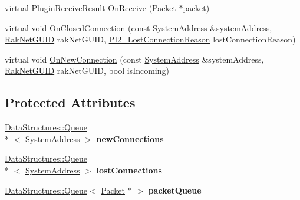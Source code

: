 \begin{DoxyCompactItemize}
\item 
virtual \hyperlink{group___p_l_u_g_i_n___i_n_t_e_r_f_a_c_e___g_r_o_u_p_ga89998adaafb29e5d879113b992161085}{Plugin\-Receive\-Result} \hyperlink{class_rak_net_1_1_rak_net_transport2_ad5607edbc41109fa3ab901c8eb47616d}{On\-Receive} (\hyperlink{struct_rak_net_1_1_packet}{Packet} $\ast$packet)
\item 
virtual void \hyperlink{class_rak_net_1_1_rak_net_transport2_a43bdc270a02f5584c5190b902ac243d9}{On\-Closed\-Connection} (const \hyperlink{struct_rak_net_1_1_system_address}{System\-Address} \&system\-Address, \hyperlink{struct_rak_net_1_1_rak_net_g_u_i_d}{Rak\-Net\-G\-U\-I\-D} rak\-Net\-G\-U\-I\-D, \hyperlink{group___p_l_u_g_i_n___i_n_t_e_r_f_a_c_e___g_r_o_u_p_ga376cc546fd6892c2ead48cd51796c8b8}{P\-I2\-\_\-\-Lost\-Connection\-Reason} lost\-Connection\-Reason)
\item 
virtual void \hyperlink{class_rak_net_1_1_rak_net_transport2_a55d99bb7a6993f5e4d4ef564dea5e487}{On\-New\-Connection} (const \hyperlink{struct_rak_net_1_1_system_address}{System\-Address} \&system\-Address, \hyperlink{struct_rak_net_1_1_rak_net_g_u_i_d}{Rak\-Net\-G\-U\-I\-D} rak\-Net\-G\-U\-I\-D, bool is\-Incoming)
\end{DoxyCompactItemize}
\subsection*{Protected Attributes}
\begin{DoxyCompactItemize}
\item 
\hypertarget{class_rak_net_1_1_rak_net_transport2_abd5a437c52e50879141abee05a98d88b}{\hyperlink{class_data_structures_1_1_queue}{Data\-Structures\-::\-Queue}\\*
$<$ \hyperlink{struct_rak_net_1_1_system_address}{System\-Address} $>$ {\bfseries new\-Connections}}\label{class_rak_net_1_1_rak_net_transport2_abd5a437c52e50879141abee05a98d88b}

\item 
\hypertarget{class_rak_net_1_1_rak_net_transport2_aff11289e1c19403f00a2f317739e6550}{\hyperlink{class_data_structures_1_1_queue}{Data\-Structures\-::\-Queue}\\*
$<$ \hyperlink{struct_rak_net_1_1_system_address}{System\-Address} $>$ {\bfseries lost\-Connections}}\label{class_rak_net_1_1_rak_net_transport2_aff11289e1c19403f00a2f317739e6550}

\item 
\hypertarget{class_rak_net_1_1_rak_net_transport2_a106688d6509ee5b14ea9ebb730eb52c9}{\hyperlink{class_data_structures_1_1_queue}{Data\-Structures\-::\-Queue}$<$ \hyperlink{struct_rak_net_1_1_packet}{Packet} $\ast$ $>$ {\bfseries packet\-Queue}}\label{class_rak_net_1_1_rak_net_transport2_a106688d6509ee5b14ea9ebb730eb52c9}

\end{DoxyCompactItemize}
